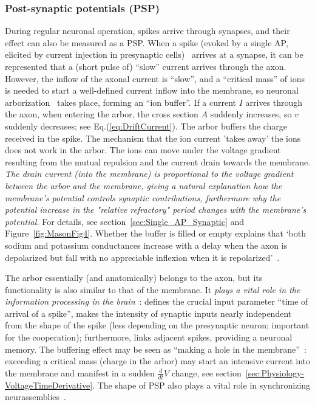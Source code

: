 \subsubsection{Post-synaptic potentials (PSP) \label{subsec:Single-PSP}}


During regular neuronal operation, spikes arrive through synapses,
and their effect can also be measured as a \gls{PSP}.
When a spike
(evoked by a single \gls{AP}, elicited by current injection in presynaptic
cells)~\cite{SynapticTransmissionMason:1991} arrives at a synapse,
it can be represented that a (short pulse of) ``slow'' current arrives
through the axon. However, the inflow of the axonal current is ``slow'',
and a ``critical mass'' of ions is needed to start a well-defined current
inflow into the membrane, so neuronal arborization~\cite{NeuronalArborisation:2021}
takes place, forming an ``ion buffer''. 
If a current $I$ arrives through the axon, when entering the arbor, the cross section $A$ suddenly increases, so $v$ suddenly decreases; see Eq.(\ref{eq:DriftCurrent}).  The arbor buffers the charge received in the spike. 
The mechanism that the ion current 'takes away' the ions does not work in the arbor. The ions can move under the voltage gradient resulting from the mutual repulsion and the current drain towards the membrane.\textit{ The drain current (into the membrane) is proportional to the voltage gradient
between the arbor and the membrane,
giving a natural explanation how the membrane's potential controls synaptic contributions,
furthermore why the potential increase in the "relative refractory" period
changes with the membrane's potential.}
For details, see section~\ref{sec:Single_AP_Synaptic} and Figure~\ref{fig:MasonFig4}.
Whether the buffer is filled or empty explains that
`both sodium and potassium conductances increase with a delay when the axon is depolarized
but fall with no appreciable inflexion when it is repolarized'~\cite{HodgkinHuxley:1952}.


The arbor essentially (and anatomically) belongs to the
axon, but its functionality is also similar to that of the membrane. It \emph{plays a vital role in the information processing in the brain}~\cite{NeuritsArbor:2022}:
defines the crucial input parameter ``time of arrival of a spike'', makes the intensity of synaptic inputs nearly independent from the shape of the spike (less depending on the presynaptic neuron; important for the cooperation); furthermore, links adjacent spikes, providing a neuronal memory.
The buffering effect may be seen as ``making a hole in the membrane''~\cite{KochElectricalPropertiesSpike:1983}:
exceeding a critical mass (charge in the arbor) may start an intensive
current into the membrane and manifest in a sudden $\frac{d}{dt}V$ change, see section~\ref{sec:Physiology-VoltageTimeDerivative}. The shape of
PSP
 also plays a vital role in 
synchronizing neurassemblies~\cite{BuzsakiCellAssemblies:2010,LosonczyIntegrative:2006}.


